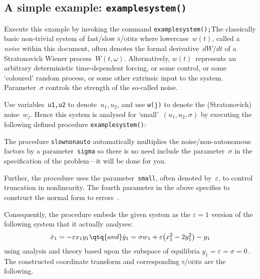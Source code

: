 \documentclass[11pt,a5paper]{article}
\def\eps{\ensuremath{\varepsilon}}
\def\sde{\textsc{s/ode}}
\begin{document}
\subsection{A simple example: \texttt{examplesystem()}} 
\label{ss:eg}
Execute this example by invoking the command
\verb|examplesystem();|\quad The classically basic
non-trivial system of fast/slow \sde{}s
where lowercase~$w(t)$, called a \emph{noise} within this
document, often denotes the formal derivative~$dW/dt$ of a
Stratonovich Wiener process~$W(t,\omega)$. Alternatively,
\(w(t)\)~represents an arbitrary deterministic
time-dependent forcing, or some control, or some `coloured'
random process, or some other extrinsic input to the system.
Parameter~$\sigma$ controls the strength of the so-called
noise.

Use variables~\verb|u1,u2| to denote~\(u_1,u_2\), and use
\verb|w(j)| to denote the (Stratonovich) noise~$w_j$.  Hence
this system is analysed for `small'~\((u_1,u_2,\sigma)\) by
executing the following defined procedure
\verb|examplesystem()|:
The procedure \verb|slownonauto| automatically multiplies
the noise\slash non-autonomous factors by a
parameter~\verb|sigma| so there is no need include the
parameter~$\sigma$ in the specification of the problem---it
will be done for you.


Further, the procedure uses the parameter~\verb|small|, often
denoted by~\(\eps\), to control truncation in nonlinearity. 
The fourth parameter in the above specifies to construct the
normal form to errors~\Ord{\eps^3}.

Consequently, the procedure embeds the given system as the
\(\eps=1\) version of the following system that it actually
analyses:
\begin{equation*}
\dot x_{1}=-\eps x_{1} y_{1} 
\qtq{and} 
\dot y_{1}=\sigma  w_{1}+\eps \big(x_{1}^{2}-2
y_{1}^{2}\big)-y_{1}
\end{equation*}
using analysis and theory based upon the subspace of
equilibria \(y_1=\eps=\sigma=0\)\,.  The constructed
coordinate transform and corresponding \sde{}s are the
following.
\end{document}
